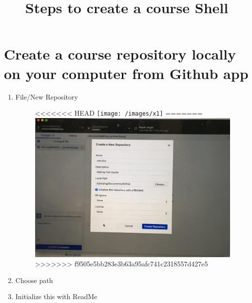\documentclass{ximera}
\title{Steps to create a course Shell }
\begin{document}
\begin{abstract}
\end{abstract}
\maketitle

\section{Create a course repository locally on your computer from Github app}
\begin{enumerate}
\item File/New Repository
\begin{center}
\begin{figure}[h]
<<<<<<< HEAD
\texttt{[image: /images/x1]}
=======
\includegraphics[scale=.1]{images/x1}
>>>>>>> f9505e5bb283e3b63a95afc741c2318557d427e5
\end{figure}
\end{center}
\item	Choose path
\item Initialize this with ReadMe
\end{enumerate}
\end{document}
